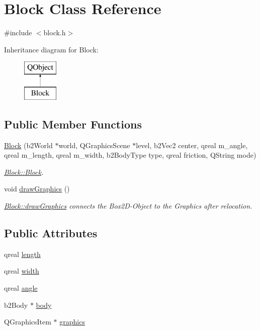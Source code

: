 \hypertarget{class_block}{}\section{Block Class Reference}
\label{class_block}


{\ttfamily \#include $<$block.\+h$>$}

Inheritance diagram for Block\+:\begin{figure}[H]
\begin{center}
\leavevmode
\includegraphics[height=2.000000cm]{class_block}
\end{center}
\end{figure}
\subsection*{Public Member Functions}
\begin{DoxyCompactItemize}
\item 
\hyperlink{class_block_acb9ba4b4221f41d888628a434052af6e}{Block} (b2\+World $\ast$world, Q\+Graphics\+Scene $\ast$level, b2\+Vec2 center, qreal m\+\_\+angle, qreal m\+\_\+length, qreal m\+\_\+width, b2\+Body\+Type type, qreal friction, Q\+String mode)
\begin{DoxyCompactList}\small\item\em \hyperlink{class_block_acb9ba4b4221f41d888628a434052af6e}{Block\+::\+Block}. \end{DoxyCompactList}\item 
void \hyperlink{class_block_a38b7625137a54cf57193c844163f9532}{draw\+Graphics} ()
\begin{DoxyCompactList}\small\item\em \hyperlink{class_block_a38b7625137a54cf57193c844163f9532}{Block\+::draw\+Graphics} connects the Box2\+D-\/\+Object to the Graphics after relocation. \end{DoxyCompactList}\end{DoxyCompactItemize}
\subsection*{Public Attributes}
\begin{DoxyCompactItemize}
\item 
qreal \hyperlink{class_block_a7ad40ed8c8d961b1ca2117835853a9c5}{length}
\item 
qreal \hyperlink{class_block_af7693d02f586bf02df6181995a66b768}{width}
\item 
qreal \hyperlink{class_block_ac19871a0cf41116b9585f34c3c21ec54}{angle}
\item 
b2\+Body $\ast$ \hyperlink{class_block_a5c9003f7f9cd6105465da994012085f8}{body}
\item 
Q\+Graphics\+Item $\ast$ \hyperlink{class_block_aab0690c05a4c1c8ee999647250b3e170}{graphics}
\end{DoxyCompactItemize}


